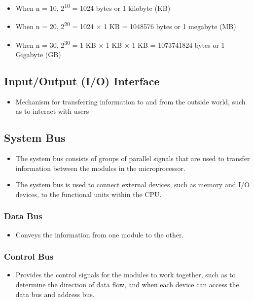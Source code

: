 \documentclass[11pt]{article}
\begin{document}
\begin{itemize}
\item When n = 10, 2\textsuperscript{10} = 1024 bytes or 1 kilobyte (KB)
\item When n = 20, 2\textsuperscript{20} = 1024 × 1 KB = 1048576 bytes or 1 megabyte (MB)
\item When n = 30, 2\textsuperscript{30} = 1 KB × 1 KB × 1 KB = 1073741824 bytes or 1 Gigabyte (GB)
\end{itemize}

\subsection{Input/Output (I/O) Interface}
\label{sec:org188646a}
\begin{itemize}
\item Mechanism for transferring information to and from the outside world, such as to interact with users
\end{itemize}

\subsection{System Bus}
\label{sec:orgba4029f}
\begin{itemize}
\item The system bus consists of groups of parallel signals that are used to transfer information between the modules in the microprocessor.
\item The system bus is used to connect external devices, such as memory and I/O devices, to the functional units within the CPU.
\end{itemize}

\subsubsection{Data Bus}
\label{sec:orgbf733f3}
\begin{itemize}
\item Conveys the information from one module to the other.
\end{itemize}

\subsubsection{Control Bus}
\label{sec:org7ea8265}
\begin{itemize}
\item Provides the control signals for the modules to work together, such as to determine the direction of data flow, and when each device can access the data bus and address bus.
\end{itemize}
\end{document}
